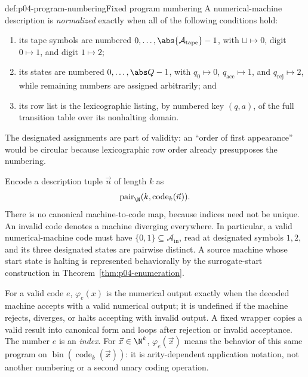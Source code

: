 \begin{hbconvention}{def:p04-program-numbering}{Fixed program numbering}
A numerical-machine description is \emph{normalized} exactly when all of the
following conditions hold:
\begin{enumerate}
\item its tape symbols are numbered
      \(0,\ldots,\abs{\mathcal A_{\mathrm{tape}}}-1\), with
      \(\sqcup\mapsto0\), digit \(0\mapsto1\), and digit \(1\mapsto2\);
\item its states are numbered \(0,\ldots,\abs Q-1\), with
      \(q_0\mapsto0\), \(q_{\mathrm{acc}}\mapsto1\), and
      \(q_{\mathrm{rej}}\mapsto2\), while remaining numbers are assigned
      arbitrarily; and
\item its row list is the lexicographic listing, by numbered key \((q,a)\),
      of the full transition table over its nonhalting domain.
\end{enumerate}
The designated
assignments are part of validity: an ``order of first appearance'' would be
circular because lexicographic row order already presupposes the numbering.

Encode a description tuple \(\vec n\) of length \(k\) as
\[
  \operatorname{pair}_{\N}(k,\operatorname{code}_k(\vec n)).
\]
There is no canonical machine-to-code map, because indices need not be unique.
An invalid code denotes a machine diverging everywhere.  In particular, a
valid numerical-machine code must have
\(\{0,1\}\subseteq\mathcal A_{\mathrm{in}}\), read at designated symbols
\(1,2\), and its three designated states are pairwise distinct.  A source
machine whose start state is halting is represented behaviorally by the
surrogate-start construction in Theorem~\ref{thm:p04-enumeration}.

For a valid code \(e\), \(\varphi_e(x)\) is the numerical output exactly when
the decoded machine accepts with a valid numerical output; it is undefined if
the machine rejects, diverges, or halts accepting with invalid output.  A fixed
wrapper copies a valid result into canonical form and loops after rejection or
invalid acceptance.  The number \(e\) is an \emph{index}.  For
\(\vec x\in\N^k\), \(\varphi_e(\vec x)\) means the behavior of this same
program on \(\operatorname{bin}(\operatorname{code}_k(\vec x))\): it is
arity-dependent application notation, not another numbering or a second unary
coding operation.
\end{hbconvention}

